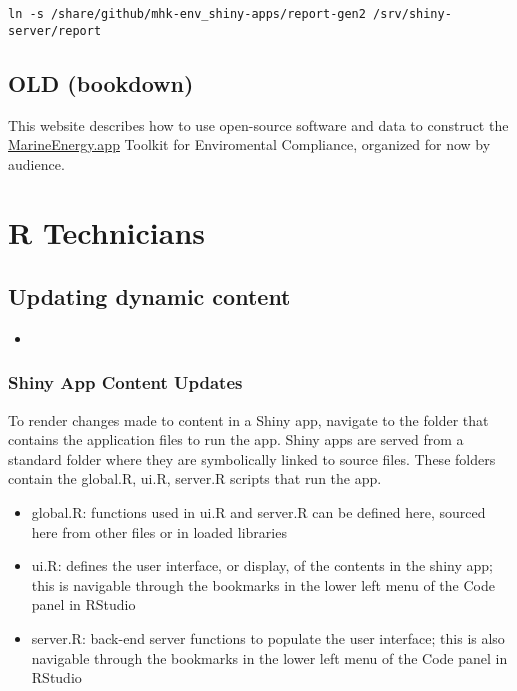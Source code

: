 \documentclass[
]{book}
\providecommand{\tightlist}{%
  \setlength{\itemsep}{0pt}\setlength{\parskip}{0pt}}
\begin{document}
\begin{verbatim}
ln -s /share/github/mhk-env_shiny-apps/report-gen2 /srv/shiny-server/report
\end{verbatim}

\hypertarget{old-bookdown}{%
\section{OLD (bookdown)}\label{old-bookdown}}

This website describes how to use open-source software and data to construct the \href{https://MarineEnergy.app}{MarineEnergy.app} Toolkit for Enviromental Compliance, organized for now by audience.

\hypertarget{rtech}{%
\chapter{R Technicians}\label{rtech}}

\hypertarget{updating-dynamic-content}{%
\section{Updating dynamic content}\label{updating-dynamic-content}}

\begin{itemize}
\tightlist
\item
\end{itemize}

\hypertarget{shiny-app-content-updates}{%
\subsection{Shiny App Content Updates}\label{shiny-app-content-updates}}

To render changes made to content in a Shiny app, navigate to the folder that contains the application files to run the app. Shiny apps are served from a standard folder where they are symbolically linked to source files. These folders contain the global.R, ui.R, server.R scripts that run the app.

\begin{itemize}
\tightlist
\item
  global.R: functions used in ui.R and server.R can be defined here, sourced here from other files or in loaded libraries
\item
  ui.R: defines the user interface, or display, of the contents in the shiny app; this is navigable through the bookmarks in the lower left menu of the Code panel in RStudio
\item
  server.R: back-end server functions to populate the user interface; this is also navigable through the bookmarks in the lower left menu of the Code panel in RStudio
\end{itemize}
\end{document}
